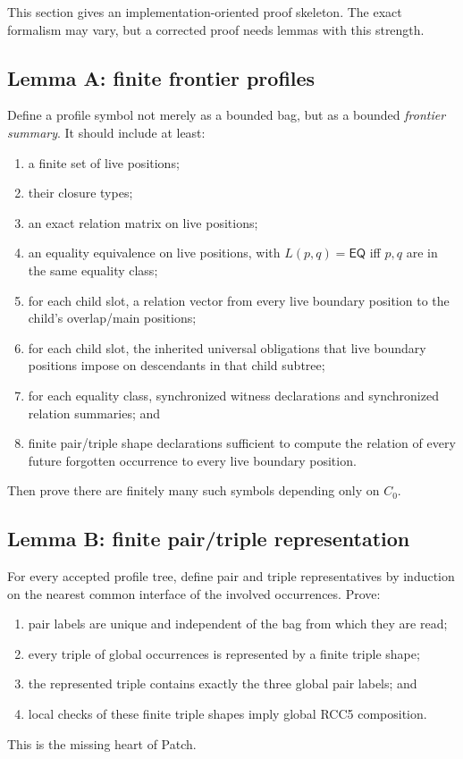 \documentclass[11pt]{article}
\newcommand{\EQ}{\mathsf{EQ}}
\begin{document}
This section gives an implementation-oriented proof skeleton.  The exact formalism may vary, but a corrected proof needs lemmas with this strength.

\subsection{Lemma A: finite frontier profiles}

Define a profile symbol not merely as a bounded bag, but as a bounded \emph{frontier summary}.  It should include at least:
\begin{enumerate}[label=(A\arabic*)]
\item a finite set of live positions;
\item their closure types;
\item an exact relation matrix on live positions;
\item an equality equivalence on live positions, with $L(p,q)=\EQ$ iff $p,q$ are in the same equality class;
\item for each child slot, a relation vector from every live boundary position to the child's overlap/main positions;
\item for each child slot, the inherited universal obligations that live boundary positions impose on descendants in that child subtree;
\item for each equality class, synchronized witness declarations and synchronized relation summaries; and
\item finite pair/triple shape declarations sufficient to compute the relation of every future forgotten occurrence to every live boundary position.
\end{enumerate}
Then prove there are finitely many such symbols depending only on $C_0$.

\subsection{Lemma B: finite pair/triple representation}

For every accepted profile tree, define pair and triple representatives by induction on the nearest common interface of the involved occurrences.  Prove:
\begin{enumerate}[label=(B\arabic*)]
\item pair labels are unique and independent of the bag from which they are read;
\item every triple of global occurrences is represented by a finite triple shape;
\item the represented triple contains exactly the three global pair labels; and
\item local checks of these finite triple shapes imply global RCC5 composition.
\end{enumerate}
This is the missing heart of \textsf{Patch}.
\end{document}
